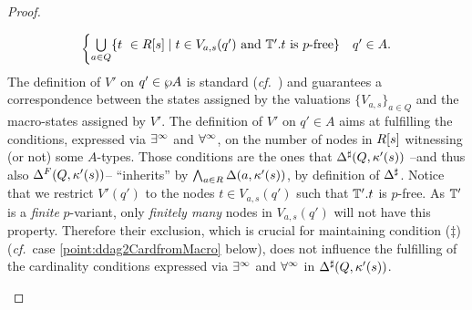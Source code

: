 \begin{proof}
\begin{enumerate}[label = (\Alph*), ref = \Alph*]
\begin{enumerate}[label = (\roman*), ref = \roman*]
\begin{align*}
\begin{cases}
               \bigcup\limits_{a \in Q} \{t\ \in R[s] \mid t \in V_{a,s}(q') \text{ and }\mathbb{T}'.t\text{ is $p$-free}\}              & q' \in A.
           \end{cases}
       \end{align*}
The definition of $V'$ on $q' \in \wp A$ is standard 
(\emph{cf.}~\cite[Prop. 2.21]{Zanasi:Thesis:2012}) and guarantees a 
correspondence between the states assigned by the valuations 
$\{V_{a,s}\}_{a \in Q}$ and the macro-states assigned by $V'$. 
The definition of $V'$ on $q' \in A$ aims at fulfilling the conditions, 
expressed via $\exists^\infty$ and $\forall^\infty$, on the number of nodes in $R[s]$ witnessing 
(or not) some $A$-types. 
Those conditions are the ones that $\Delta^{\sharp}(Q,\kappa'(s))$ --and thus also
$\Delta^{F}(Q,\kappa'(s))$-- ``inherits'' by $\bigwedge_{a \in R} 
\Delta(a,\kappa'(s))$, by definition of $\Delta^{\sharp}$. 
Notice that we restrict $V'(q')$ to the nodes $t \in V_{a,s}(q')$ such that 
$\mathbb{T}'.t$ is $p$-free.
As $\mathbb{T}'$ is a \emph{finite} $p$-variant, only \emph{finitely many} nodes in
$V_{a,s}(q')$ will not have this property.
Therefore their exclusion, which is crucial for maintaining condition ($\ddag$) 
(\emph{cf.}~case \eqref{point:ddag2CardfromMacro} below), does not influence 
the fulfilling of the cardinality conditions expressed via $\exists^\infty$ and $\forall^\infty$ in 
$\Delta^{\sharp}(Q,\kappa'(s))$.


\end{enumerate}
\end{enumerate}
\end{proof}
